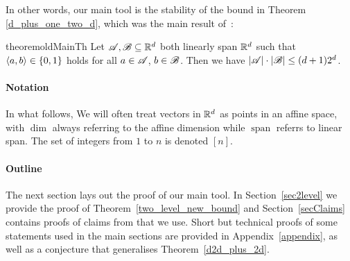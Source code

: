 \noindent In other words, our main tool is the stability of the bound in Theorem \ref{d_plus_one_two_d}, which was the main result of~\cite{kupavskii22}:

\begin{restatable}{theorem}{oldMainTh}
    \label{d_plus_one_two_d}
    Let ${\mathscr{A}},{\mathscr{B}} \subseteq {\mathbb{R}}^d$ both linearly span ${\mathbb{R}}^d$ such that $\langle a, b\rangle \in \{0,1\}$ holds for all $a \in {\mathscr{A}}$, $b \in {\mathscr{B}}$.
    Then we have $|{\mathscr{A}}| \cdot |{\mathscr{B}}| \le (d+1) 2^d$.
\end{restatable}

\paragraph{Notation}
In what follows, We will often treat vectors in ${\mathbb{R}}^d$ as points in an affine space, with $\operatorname{dim}$ always referring to the affine dimension while $\operatorname{span}$ referrs to linear span. The set of integers  from $1$ to $n$ is denoted $[n]$. 

\paragraph{Outline}
The next section lays out the proof of our main tool. In Section~\ref{sec2level} we provide the proof of Theorem~\ref{two_level_new_bound} and Section~\ref{secClaims} contains proofs of claims from \cite{kupavskii22} that we use. Short but technical proofs of some statements used in the main sections are provided in Appendix~\ref{appendix}, as well as a conjecture that generalises Theorem~\ref{d2d_plus_2d}.